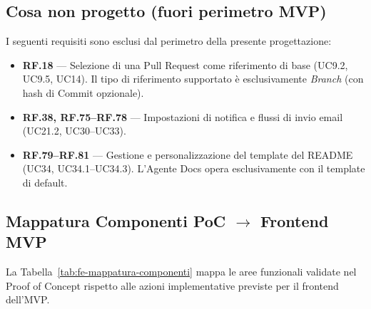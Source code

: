 \documentclass[11pt,a4paper]{article}
\begin{document}
\subsection{Cosa non progetto (fuori perimetro MVP)}

I seguenti requisiti sono esclusi dal perimetro della presente progettazione:

\begin{itemize}
    \item \textbf{RF.18} --- Selezione di una Pull Request come riferimento di base (UC9.2, UC9.5, UC14). Il tipo di riferimento supportato è esclusivamente \emph{Branch} (con hash di Commit opzionale).
    \item \textbf{RF.38, RF.75--RF.78} --- Impostazioni di notifica e flussi di invio email (UC21.2, UC30--UC33).
    \item \textbf{RF.79--RF.81} --- Gestione e personalizzazione del template del README (UC34, UC34.1--UC34.3). L'Agente Docs opera esclusivamente con il template di default.
\end{itemize}

\subsection{Mappatura Componenti PoC $\to$ Frontend MVP}

La Tabella~\ref{tab:fe-mappatura-componenti} mappa le aree funzionali validate nel Proof of Concept rispetto alle azioni implementative previste per il frontend dell'MVP.
\end{document}
